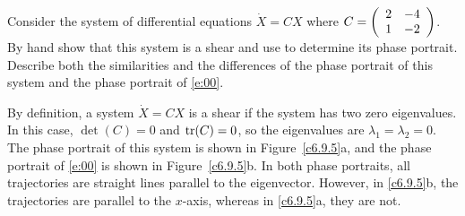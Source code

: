 \documentclass{ximera}
\begin{document}
\begin{computerExercise} \label{c6.9.5}
Consider the system of differential equations $\dot{X}=CX$ where
$C=\left(\begin{array}{rr} 2 & -4\\ 1 &-2\end{array}\right)$.  By hand show that this system is a shear and
use {\pplane} to determine its phase portrait.  Describe both the
similarities and the differences of the phase portrait of this system
and the phase portrait of \eqref{e:00}.

\begin{solution}

By definition, a system $\dot{X} = CX$ is a shear if the system has two
zero eigenvalues.  In this case, $\det(C) = 0$ and ${\rm tr}(C) = 0$, so
the eigenvalues are $\lambda_1 = \lambda_2 = 0$.  The phase portrait of
this system is shown in Figure~\ref{c6.9.5}a, and the phase portrait of
\eqref{e:00} is shown in Figure~\ref{c6.9.5}b.  In both phase portraits,
all trajectories are straight lines parallel to the eigenvector.  However,
in \ref{c6.9.5}b, the trajectories are parallel to the $x$-axis, whereas
in \ref{c6.9.5}a, they are not.

\begin{figure}[htb]
                       \centerline{%
                       }
\end{figure}







\end{solution}
\end{computerExercise}
\end{document}
